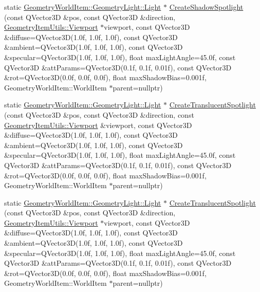 \begin{DoxyCompactItemize}
\item 
static \mbox{\hyperlink{class_geometry_engine_1_1_geometry_world_item_1_1_geometry_light_1_1_light}{Geometry\+World\+Item\+::\+Geometry\+Light\+::\+Light}} $\ast$ \mbox{\hyperlink{class_geometry_engine_1_1_geometry_factory_a11eb3aa78243fffeeb9673d73a37c73e}{Create\+Shadow\+Spotlight}} (const Q\+Vector3D \&pos, const Q\+Vector3D \&direction, \mbox{\hyperlink{class_geometry_engine_1_1_geometry_item_utils_1_1_viewport}{Geometry\+Item\+Utils\+::\+Viewport}} $\ast$viewport, const Q\+Vector3D \&diffuse=Q\+Vector3D(1.\+0f, 1.\+0f, 1.\+0f), const Q\+Vector3\+D \&ambient=\+Q\+Vector3\+D(1.\+0f, 1.\+0f, 1.\+0f), const Q\+Vector3\+D \&specular=\+Q\+Vector3\+D(1.\+0f, 1.\+0f, 1.\+0f), float max\+Light\+Angle=45.\+0f, const Q\+Vector3\+D \&att\+Params=\+Q\+Vector3\+D(0.\+1f, 0.\+1f, 0.\+01f), const Q\+Vector3\+D \&rot=\+Q\+Vector3\+D(0.\+0f, 0.\+0f, 0.\+0f), float max\+Shadow\+Bias=0.\+001f, Geometry\+World\+Item\+::\+World\+Item $\ast$parent=nullptr)
\item 
static \mbox{\hyperlink{class_geometry_engine_1_1_geometry_world_item_1_1_geometry_light_1_1_light}{Geometry\+World\+Item\+::\+Geometry\+Light\+::\+Light}} $\ast$ \mbox{\hyperlink{class_geometry_engine_1_1_geometry_factory_a01c26b2bd2ec04d166bc7e5494b9c989}{Create\+Translucent\+Spotlight}} (const Q\+Vector3D \&pos, const Q\+Vector3D \&direction, const \mbox{\hyperlink{class_geometry_engine_1_1_geometry_item_utils_1_1_viewport}{Geometry\+Item\+Utils\+::\+Viewport}} \&viewport, const Q\+Vector3D \&diffuse=Q\+Vector3D(1.\+0f, 1.\+0f, 1.\+0f), const Q\+Vector3\+D \&ambient=\+Q\+Vector3\+D(1.\+0f, 1.\+0f, 1.\+0f), const Q\+Vector3\+D \&specular=\+Q\+Vector3\+D(1.\+0f, 1.\+0f, 1.\+0f), float max\+Light\+Angle=45.\+0f, const Q\+Vector3\+D \&att\+Params=\+Q\+Vector3\+D(0.\+1f, 0.\+1f, 0.\+01f), const Q\+Vector3\+D \&rot=\+Q\+Vector3\+D(0.\+0f, 0.\+0f, 0.\+0f), float max\+Shadow\+Bias=0.\+001f, Geometry\+World\+Item\+::\+World\+Item $\ast$parent=nullptr)
\item 
static \mbox{\hyperlink{class_geometry_engine_1_1_geometry_world_item_1_1_geometry_light_1_1_light}{Geometry\+World\+Item\+::\+Geometry\+Light\+::\+Light}} $\ast$ \mbox{\hyperlink{class_geometry_engine_1_1_geometry_factory_a8310ba9fcdd26b11faff28157f3dbf7f}{Create\+Translucent\+Spotlight}} (const Q\+Vector3D \&pos, const Q\+Vector3D \&direction, \mbox{\hyperlink{class_geometry_engine_1_1_geometry_item_utils_1_1_viewport}{Geometry\+Item\+Utils\+::\+Viewport}} $\ast$viewport, const Q\+Vector3D \&diffuse=Q\+Vector3D(1.\+0f, 1.\+0f, 1.\+0f), const Q\+Vector3\+D \&ambient=\+Q\+Vector3\+D(1.\+0f, 1.\+0f, 1.\+0f), const Q\+Vector3\+D \&specular=\+Q\+Vector3\+D(1.\+0f, 1.\+0f, 1.\+0f), float max\+Light\+Angle=45.\+0f, const Q\+Vector3\+D \&att\+Params=\+Q\+Vector3\+D(0.\+1f, 0.\+1f, 0.\+01f), const Q\+Vector3\+D \&rot=\+Q\+Vector3\+D(0.\+0f, 0.\+0f, 0.\+0f), float max\+Shadow\+Bias=0.\+001f, Geometry\+World\+Item\+::\+World\+Item $\ast$parent=nullptr)

\end{DoxyCompactItemize}

